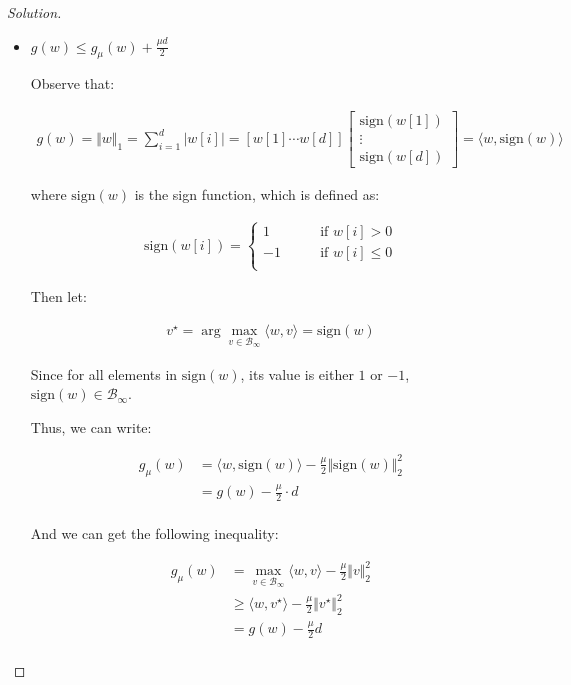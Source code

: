 \documentclass{article}
\newenvironment{solution}
  {\renewcommand\qedsymbol{$\blacksquare$}\begin{proof}[Solution]}
  {\end{proof}}
\begin{document}
\begin{solution}
\begin{itemize}
        \item \underline{$g(w) \leq g_\mu(w) + \frac{\mu d}{2}$}
        \bigskip

        Observe that:

        \begin{align*}
            g(w)
            = \Vert w \Vert_1 
            = \sum_{i=1}^d \vert w[i] \vert 
            = \left[ w[1] \cdots w[d] \right] 
            \begin{bmatrix}
                \mathrm{sign}(w[1]) \\
                \vdots \\
                \mathrm{sign}(w[d])
            \end{bmatrix}
            = \langle w, \mathrm{sign}(w) \rangle
        \end{align*}

        where $\mathrm{sign}(w)$ is the sign function, which is defined as:
        
        \begin{align*}
            \mathrm{sign}(w[i]) = \begin{cases}
                1 \qquad &\text{if } w[i] > 0 \\
                -1 \qquad &\text{if } w[i] \leq 0 \\
            \end{cases}
        \end{align*}

        Then let:

        \begin{align*}
            v^\star = \arg\max_{v \in \mathcal{B}_\infty} \langle w, v \rangle = \mathrm{sign}(w)
        \end{align*}

        Since for all elements in $\mathrm{sign}(w)$, its value is either $1$ or $-1$, 
        $\mathrm{sign}(w) \in \mathcal{B}_\infty$.

        Thus, we can write:

        \begin{align*}
            g_\mu(w) 
            &= \langle w, \mathrm{sign}(w) \rangle - \frac{\mu}{2} \Vert \mathrm{sign}(w) \Vert_2^2 \\
            &= g(w) - \frac{\mu}{2} \cdot d \\
        \end{align*}

        And we can get the following inequality:

        \begin{align*}
            g_\mu(w) 
            &= \max_{v \in \mathcal{B}_\infty} \langle w, v \rangle - \frac{\mu}{2} \Vert v \Vert_2^2 \\
            &\geq \langle w, v^\star \rangle - \frac{\mu}{2} \Vert v^\star \Vert_2^2 \\
            &= g(w) - \frac{\mu}{2} d \\
        \end{align*}


\end{itemize}
\end{solution}
\end{document}
